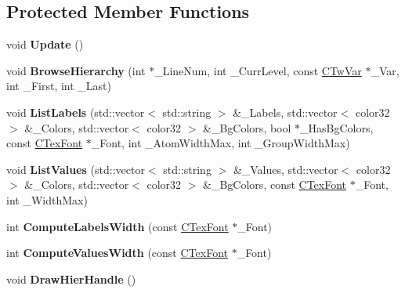 \subsection*{Protected Member Functions}
\begin{DoxyCompactItemize}
\item 
\hypertarget{struct_c_tw_bar_a0ab1939cd6d5511571c84aac3d801285}{void {\bfseries Update} ()}\label{struct_c_tw_bar_a0ab1939cd6d5511571c84aac3d801285}

\item 
\hypertarget{struct_c_tw_bar_add2b2f30ba9bf4de8e439bc42a25041d}{void {\bfseries Browse\+Hierarchy} (int $\ast$\+\_\+\+Line\+Num, int \+\_\+\+Curr\+Level, const \hyperlink{struct_c_tw_var}{C\+Tw\+Var} $\ast$\+\_\+\+Var, int \+\_\+\+First, int \+\_\+\+Last)}\label{struct_c_tw_bar_add2b2f30ba9bf4de8e439bc42a25041d}

\item 
\hypertarget{struct_c_tw_bar_a2ce28882a6b28f51c2cc6d7499b75d83}{void {\bfseries List\+Labels} (std\+::vector$<$ std\+::string $>$ \&\+\_\+\+Labels, std\+::vector$<$ color32 $>$ \&\+\_\+\+Colors, std\+::vector$<$ color32 $>$ \&\+\_\+\+Bg\+Colors, bool $\ast$\+\_\+\+Has\+Bg\+Colors, const \hyperlink{struct_c_tex_font}{C\+Tex\+Font} $\ast$\+\_\+\+Font, int \+\_\+\+Atom\+Width\+Max, int \+\_\+\+Group\+Width\+Max)}\label{struct_c_tw_bar_a2ce28882a6b28f51c2cc6d7499b75d83}

\item 
\hypertarget{struct_c_tw_bar_a1a9f51637d1cc77f90025d79a02021ba}{void {\bfseries List\+Values} (std\+::vector$<$ std\+::string $>$ \&\+\_\+\+Values, std\+::vector$<$ color32 $>$ \&\+\_\+\+Colors, std\+::vector$<$ color32 $>$ \&\+\_\+\+Bg\+Colors, const \hyperlink{struct_c_tex_font}{C\+Tex\+Font} $\ast$\+\_\+\+Font, int \+\_\+\+Width\+Max)}\label{struct_c_tw_bar_a1a9f51637d1cc77f90025d79a02021ba}

\item 
\hypertarget{struct_c_tw_bar_a24eb37de544e5123f61d15a51b9902c4}{int {\bfseries Compute\+Labels\+Width} (const \hyperlink{struct_c_tex_font}{C\+Tex\+Font} $\ast$\+\_\+\+Font)}\label{struct_c_tw_bar_a24eb37de544e5123f61d15a51b9902c4}

\item 
\hypertarget{struct_c_tw_bar_a29fd44dd0bb1103759d672dc7bf9a582}{int {\bfseries Compute\+Values\+Width} (const \hyperlink{struct_c_tex_font}{C\+Tex\+Font} $\ast$\+\_\+\+Font)}\label{struct_c_tw_bar_a29fd44dd0bb1103759d672dc7bf9a582}

\item 
\hypertarget{struct_c_tw_bar_a794144a08623518a6e681096ca571126}{void {\bfseries Draw\+Hier\+Handle} ()}\label{struct_c_tw_bar_a794144a08623518a6e681096ca571126}


\end{DoxyCompactItemize}
